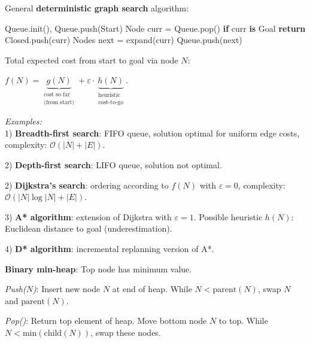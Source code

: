 \documentclass[landscape]{article}
\newcommand{\vmspace}{\vspace{-7pt}}
\newcommand{\vamspace}{\vspace{-3pt}}
\newcommand{\vpspace}{\vspace{5pt}}
\begin{document}
\begin{multicols}{3}
\vpspace

\begin{minipage}{\columnwidth}
  General \textbf{deterministic graph search} algorithm:

  \vamspace

  \begin{algorithm}[H]
    \DontPrintSemicolon
    Queue.init(),
    Queue.push(Start)\;
    {
      Node curr = Queue.pop()\;
      \textbf{if} curr \textbf{is} Goal \textbf{return}\;
      Closed.push(curr)\;
      Nodes next = expand(curr)\;
      {
        Queue.push(next)\;
      }
    }
  \end{algorithm}
\end{minipage}

\begin{minipage}{\columnwidth}
  Total expected cost from start to goal via node $N$:
  \vmspace
  \begin{center}
    $f(N) = \underbrace{g(N)}_{\substack{\text{cost so far} \\
    \text{(from start)}}}
    + \varepsilon\cdot\underbrace{h(N)}_{\substack{
    \text{heuristic} \\ \text{cost-to-go}
    }
    }.$
  \end{center}
\end{minipage}

\vmspace

\begin{minipage}{\columnwidth}
  \textit{Examples:}\\
  1) \textbf{Breadth-first search}: FIFO queue, solution optimal for uniform
  edge costs, complexity: $\mathcal O (|N| + |E|)$.

  2) \textbf{Depth-first search}: LIFO queue, solution not optimal.

  2) \textbf{Dijkstra's search}: ordering according to $f(N)$ with $\varepsilon
  = 0$, complexity: $\mathcal O (|N|\log |N| + |E|)$.

  3) \textbf{A* algorithm}: extension of Dijkstra with $\varepsilon=1$. Possible
  heuristic $h(N)$: Euclidean distance to goal (underestimation).

  4) \textbf{D* algorithm}: incremental replanning version of A*.
\end{minipage}

\vpspace

\begin{minipage}{\columnwidth}
  \textbf{Binary min-heap}: Top node has minimum value.
  \begin{compactitem}
  \item \textit{Push($N$)}: Insert new node $N$ at end of heap. While $N <
    \mathrm{parent}(N)$, swap $N$ and $\mathrm{parent}(N)$.
  \item \textit{Pop()}: Return top element of heap. Move bottom node $N$ to top.
    While $N < \mathrm{min}(\mathrm{child}(N))$, swap these nodes.
  \end{compactitem}
\end{minipage}


\end{multicols}
\end{document}
